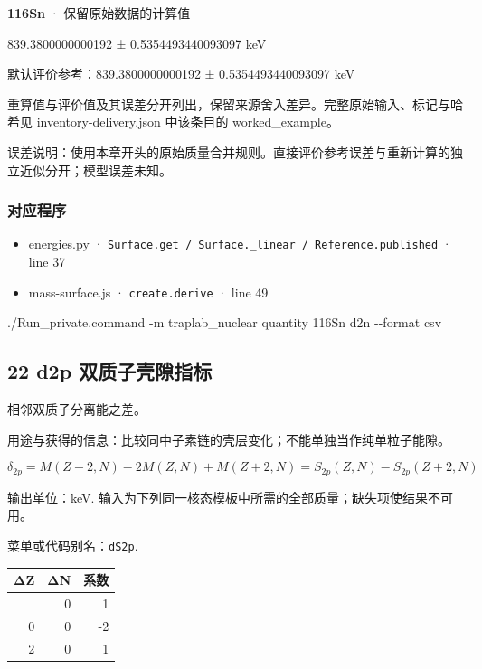 \documentclass[
  11pt,
  letterpaper,
]{article}
\newenvironment{Shaded}{}{}
\newcommand{\AttributeTok}[1]{\textcolor[rgb]{0.49,0.56,0.16}{#1}}
\newcommand{\ExtensionTok}[1]{#1}
\newcommand{\NormalTok}[1]{#1}
\providecommand{\tightlist}{%
  \setlength{\itemsep}{0pt}\setlength{\parskip}{0pt}}
\begin{document}
\textbf{116Sn} · 保留原始数据的计算值

839.3800000000192 ± 0.5354493440093097 keV

默认评价参考：839.3800000000192 ± 0.5354493440093097 keV

重算值与评价值及其误差分开列出，保留来源舍入差异。完整原始输入、标记与哈希见
inventory-delivery.json 中该条目的 worked\_example。

误差说明：使用本章开头的原始质量合并规则。直接评价参考误差与重新计算的独立近似分开；模型误差未知。

\subsubsection{对应程序}\label{ux5bf9ux5e94ux7a0bux5e8f-20}

\begin{itemize}
\tightlist
\item
  energies.py ·
  \texttt{Surface.get\ /\ Surface.\_linear\ /\ Reference.published} ·
  line 37
\item
  mass-surface.js · \texttt{create.derive} · line 49
\end{itemize}

\begin{Shaded}
\begin{Highlighting}[]
\ExtensionTok{./Run\_private.command} \AttributeTok{{-}m}\NormalTok{ traplab\_nuclear quantity 116Sn d2n }\AttributeTok{{-}{-}format}\NormalTok{ csv}
\end{Highlighting}
\end{Shaded}

\subsection{22 d2p
双质子壳隙指标}\label{d2p-ux53ccux8d28ux5b50ux58f3ux9699ux6307ux6807}

相邻双质子分离能之差。

用途与获得的信息：比较同中子素链的壳层变化；不能单独当作纯单粒子能隙。

\[
\delta_{2p}=M(Z-2,N)-2M(Z,N)+M(Z+2,N)=S_{2p}(Z,N)-S_{2p}(Z+2,N)
\]

输出单位：keV.
输入为下列同一核态模板中所需的全部质量；缺失项使结果不可用。

菜单或代码别名：\texttt{dS2p}.

\begin{longtable}[]{@{}rrr@{}}
\toprule\noalign{}
ΔZ & ΔN & 系数 \\
\midrule\noalign{}
\endhead
\bottomrule\noalign{}
\endlastfoot
-2 & 0 & 1 \\
0 & 0 & -2 \\
2 & 0 & 1 \\
\end{longtable}
\end{document}
